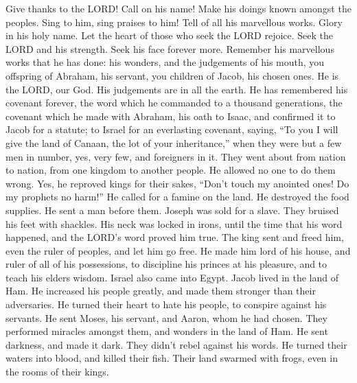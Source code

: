  Give thanks to the LORD! Call on his name! Make his
doings known amongst the peoples.  Sing to him, sing
praises to him! Tell of all his marvellous works.  Glory
in his holy name. Let the heart of those who seek the LORD rejoice.
 Seek the LORD and his strength. Seek his face forever
more.  Remember his marvellous works that he has done: his
wonders, and the judgements of his mouth,  you offspring
of Abraham, his servant, you children of Jacob, his chosen ones.
 He is the LORD, our God. His judgements are in all the
earth.  He has remembered his covenant forever, the word
which he commanded to a thousand generations,  the
covenant which he made with Abraham, his oath to Isaac, 
and confirmed it to Jacob for a statute; to Israel for an everlasting
covenant,  saying, ``To you I will give the land of
Canaan, the lot of your inheritance,''  when they were
but a few men in number, yes, very few, and foreigners in it.
 They went about from nation to nation, from one kingdom
to another people.  He allowed no one to do them wrong.
Yes, he reproved kings for their sakes,  ``Don't touch my
anointed ones! Do my prophets no harm!''  He called for a
famine on the land. He destroyed the food supplies.  He
sent a man before them. Joseph was sold for a slave. 
They bruised his feet with shackles. His neck was locked in irons,
 until the time that his word happened, and the LORD's
word proved him true.  The king sent and freed him, even
the ruler of peoples, and let him go free.  He made him
lord of his house, and ruler of all of his possessions, 
to discipline his princes at his pleasure, and to teach his elders
wisdom.  Israel also came into Egypt. Jacob lived in the
land of Ham.  He increased his people greatly, and made
them stronger than their adversaries.  He turned their
heart to hate his people, to conspire against his servants.
 He sent Moses, his servant, and Aaron, whom he had
chosen.  They performed miracles amongst them, and
wonders in the land of Ham.  He sent darkness, and made
it dark. They didn't rebel against his words.  He turned
their waters into blood, and killed their fish.  Their
land swarmed with frogs, even in the rooms of their kings.
